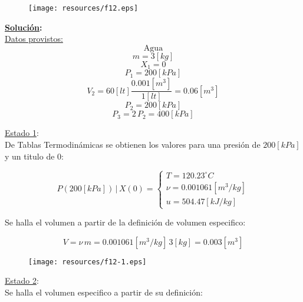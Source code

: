 \documentclass[letter,11pt]{article}
\begin{document}
\begin{enumerate}
\begin{figure}[H]
\centering
\texttt{[image: resources/f12.eps]}
\end{figure}

\textbf{\underline{Solución}:} \\

\underline{Datos provistos:}
\begin{equation*}
    \text{Agua}
\end{equation*}
\begin{equation*}
    m = 3[kg]
\end{equation*}
\begin{equation*}
    X_1 = 0
\end{equation*}
\begin{equation*}
    P_1 = 200[kPa]
\end{equation*}
\begin{equation*}
    V_2 = 60[lt]\frac{0.001[m^3]}{1[lt]} = 0.06[m^3]
\end{equation*}
\begin{equation*}
    P_2 = 200[kPa]
\end{equation*}
\begin{equation*}
    P_3 = 2\,P_2 = 400[kPa]
\end{equation*}

\underline{Estado 1}: \\
De Tablas Termodinámicas se obtienen los valores para una presión de
$200[kPa]$ y un titulo de $0$:

\begin{equation*}
    P(200[kPa])\,|\,X(0) = \begin{cases}
        T = 120.23^\circ C \\
        \nu = 0.001061[m^3/kg] \\
        u = 504.47[kJ/kg]
    \end{cases}
\end{equation*}

Se halla el volumen a partir de la definición de volumen especifico:

\begin{equation*}
    V = \nu\,m = 0.001061[m^3/kg]\,3[kg] = 0.003[m^3]
\end{equation*}

\begin{figure}[H]
\centering
\texttt{[image: resources/f12-1.eps]}
\end{figure}

\underline{Estado 2}: \\
Se halla el volumen especifico a partir de su definición:


\end{enumerate}
\end{document}
